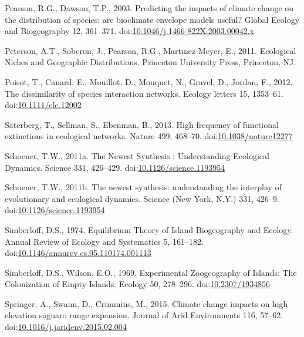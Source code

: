 \hypertarget{ref-Pearson2003}{}
Pearson, R.G., Dawson, T.P., 2003. Predicting the impacts of climate
change on the distribution of species: are bioclimate envelope models
useful? Global Ecology and Biogeography 12, 361--371.
doi:\href{https://doi.org/10.1046/j.1466-822X.2003.00042.x}{10.1046/j.1466-822X.2003.00042.x}

\hypertarget{ref-Peterson2011}{}
Peterson, A.T., Soberon, J., Pearson, R.G., Martinez-Meyer, E., 2011.
Ecological Niches and Geographic Distributions. Princeton University
Press, Princeton, NJ.

\hypertarget{ref-Poisot2012}{}
Poisot, T., Canard, E., Mouillot, D., Mouquet, N., Gravel, D., Jordan,
F., 2012. The dissimilarity of species interaction networks. Ecology
letters 15, 1353--61.
doi:\href{https://doi.org/10.1111/ele.12002}{10.1111/ele.12002}

\hypertarget{ref-Saterberg2013}{}
Säterberg, T., Sellman, S., Ebenman, B., 2013. High frequency of
functional extinctions in ecological networks. Nature 499, 468--70.
doi:\href{https://doi.org/10.1038/nature12277}{10.1038/nature12277}

\hypertarget{ref-Schoener2011a}{}
Schoener, T.W., 2011a. The Newest Synthesis : Understanding Ecological
Dynamics. Science 331, 426--429.
doi:\href{https://doi.org/10.1126/science.1193954}{10.1126/science.1193954}

\hypertarget{ref-Schoener2011}{}
Schoener, T.W., 2011b. The newest synthesis: understanding the interplay
of evolutionary and ecological dynamics. Science (New York, N.Y.) 331,
426--9.
doi:\href{https://doi.org/10.1126/science.1193954}{10.1126/science.1193954}

\hypertarget{ref-Simberloff1974a}{}
Simberloff, D.S., 1974. Equilibrium Theory of Island Biogeography and
Ecology. Annual Review of Ecology and Systematics 5, 161--182.
doi:\href{https://doi.org/10.1146/annurev.es.05.110174.001113}{10.1146/annurev.es.05.110174.001113}

\hypertarget{ref-Simberloff2016}{}
Simberloff, D.S., Wilson, E.O., 1969. Experimental Zoogeography of
Islands: The Colonization of Empty Islands. Ecology 50, 278--296.
doi:\href{https://doi.org/10.2307/1934856}{10.2307/1934856}

\hypertarget{ref-Springer2015}{}
Springer, A., Swann, D., Crimmins, M., 2015. Climate change impacts on
high elevation saguaro range expansion. Journal of Arid Environments
116, 57--62.
doi:\href{https://doi.org/10.1016/j.jaridenv.2015.02.004}{10.1016/j.jaridenv.2015.02.004}


